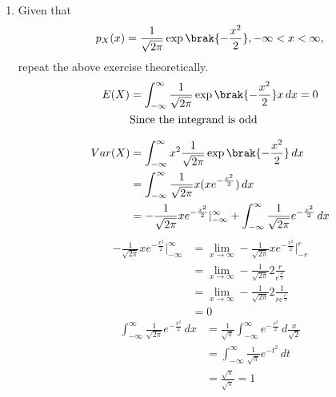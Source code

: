 \documentclass[journal,12pt,twocolumn]{IEEEtran}
\renewcommand\thesection{\arabic{section}}
\begin{document}
\begin{enumerate}[label=\thesection.\arabic*
,ref=\thesection.\theenumi]
\solution
\begin{align}
    E[X] &= 0.000326\\
Var[X] &= 1.000906
\end{align}
\begin{lstlisting}
wget https://github.com/NityaBhamidipaty/RandAssig/blob/main/codes/coeffs.h
wget https://github.com/NityaBhamidipaty/RandAssig/blob/main/codes/main.c
\end{lstlisting}
\item Given that 
\begin{align}
p_{X}(x) = \frac{1}{\sqrt{2\pi}}\exp\brak{-\frac{x^2}{2}}, -\infty < x < \infty,
\end{align}
repeat the above exercise theoretically.\\
\solution
\begin{align}
    E(X) &= \int_{-\infty}^{\infty}\frac{1}{\sqrt{2\pi}}\exp\brak{-\frac{x^2}{2}}x\,dx
     = 0 \\
     & \text{Since the integrand is odd}
\end{align}

\begin{align}
    Var(X) &=\int_{-\infty}^{\infty}x^2\frac{1}{\sqrt{2\pi}}\exp\brak{-\frac{x^2}{2}}\,dx\\
    &= \int_{-\infty}^{\infty}\frac{1}{\sqrt{2\pi}}x(xe^{-\frac{x^2}{2}})\,dx\\
    &= -\frac{1}{\sqrt{2\pi}}xe^{-\frac{x^2}{2}}|_{-\infty}^{\infty} + \int_{-\infty}^{\infty}\frac{1}{\sqrt{2\pi}}e^{-\frac{x^2}{2}}\,dx
\end{align}
\begin{align}
        -\frac{1}{\sqrt{2\pi}}xe^{-\frac{x^2}{2}}|_{-\infty}^{\infty} &= \lim_{x\to\infty}-\frac{1}{\sqrt{2\pi}}xe^{-\frac{x^2}{2}}|_{-r}^{r}\\
        &= \lim_{x\to\infty}-\frac{1}{\sqrt{2\pi}}2\frac{r}{e^{\frac{r^2}{2}}}\\
                &= \lim_{x\to\infty}-\frac{1}{\sqrt{2\pi}}2\frac{1}{re^{\frac{r^2}{2}}}\\
                &= 0
\end{align}
\begin{align}
    \int_{-\infty}^{\infty}\frac{1}{\sqrt{2\pi}}e^{-\frac{x^2}{2}}\,dx &= \frac{1}{\sqrt{\pi}}\int_{-\infty}^{\infty}e^{-\frac{x^2}{2}}\,d\frac{x}{\sqrt{2}}\\
    &= \int_{-\infty}^{\infty}\frac{1}{\sqrt{\pi}}e^{-t^2}\,dt\\
    &= \frac{\sqrt{\pi}}{\sqrt{\pi}} = 1
\end{align}
\end{enumerate}
\end{document}
